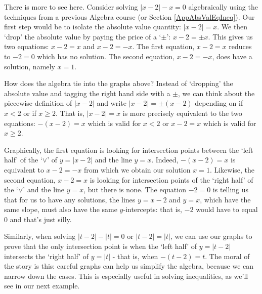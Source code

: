 \documentclass{ximera}
\begin{document}
\medskip

There is more to see here.  Consider solving $|x-2|-x=0$ algebraically using the techniques from a previous Algebra course (or Section \ref{AppAbsValEqIneq}).  Our first step would be to isolate the absolute value quantity:  $|x-2| = x$.  We  then `drop' the absolute value by paying the price of a `$\pm$':  $x-2 = \pm x$.  This gives us two equations:  $x - 2 = x$ and $x - 2 = -x$.  The first equation, $x-2 = x$ reduces to $-2 = 0$ which has no solution.  The second equation, $x-2 = -x$, does have a solution, namely $x = 1$.  

\medskip

How does the algebra tie into the graphs above?  Instead of `dropping' the absolute value and tagging the right hand side with a $\pm$, we can think about the piecewise definition of $|x-2|$ and write $|x-2| = \pm(x-2)$ depending on if $x < 2$ or if $x \geq 2$.  That is, $|x-2| = x$ is more precisely equivalent to the two equations: $-(x-2) = x$ which is valid for  $x < 2$ or $x-2 = x$   which is valid for $x \geq 2$.  

\medskip

Graphically, the first equation is looking for intersection points between the `left half' of the `$\vee$' of $y = |x-2|$ and the line $y =x$.  Indeed, $-(x-2)=x$ is equivalent to $x-2 = -x$ from which we obtain our solution $x = 1$. Likewise, the second equation, $x-2 = x$  is looking for intersection points of the 	`right half' of the `$\vee$' and the line $y = x$, but there is none.  The equation $-2=0$ is telling us that for us to have any solutions, the lines $y = x-2$ and $y = x$, which have the same slope, must also have the same $y$-intercepts:  that is, $-2$ would have to equal $0$ and that's just silly.  

\medskip

Similarly, when solving $|t-2| - |t| = 0$ or $|t-2| = |t|$, we can use our graphs to prove that the only intersection point is when the `left half' of $y = |t-2|$ intersects the `right half' of $y = |t|$ - that is, when $-(t-2) = t$.  The moral of the story is this:  careful graphs can help us simplify the algebra, because we can narrow down the cases.  This is especially useful in solving inequalities, as we'll see in our next example.
\end{document}
